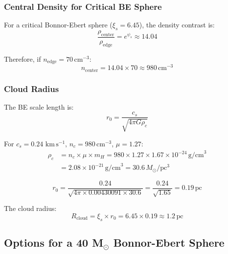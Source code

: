 \documentclass[11pt,a4paper]{article}
\newcommand{\Msun}{M_\odot}
\newcommand{\kms}{\,\mathrm{km\,s^{-1}}}
\begin{document}
\subsubsection{Central Density for Critical BE Sphere}

For a critical Bonnor-Ebert sphere ($\xi_s = 6.45$), the density contrast is:
\begin{equation}
    \frac{\rho_\mathrm{center}}{\rho_\mathrm{edge}} = e^{\psi_s} \approx 14.04
\end{equation}

Therefore, if $n_\mathrm{edge} = 70\,\mathrm{cm}^{-3}$:
\begin{equation}
    n_\mathrm{center} = 14.04 \times 70 \approx 980\,\mathrm{cm}^{-3}
\end{equation}

\subsubsection{Cloud Radius}

The BE scale length is:
\begin{equation}
    r_0 = \frac{c_s}{\sqrt{4\pi G \rho_c}}
\end{equation}

For $c_s = 0.24\,\kms$, $n_c = 980\,\mathrm{cm}^{-3}$, $\mu = 1.27$:
\begin{align}
    \rho_c &= n_c \times \mu \times m_H = 980 \times 1.27 \times 1.67 \times 10^{-24}\,\mathrm{g/cm}^3 \\
           &= 2.08 \times 10^{-21}\,\mathrm{g/cm}^3 = 30.6\,\Msun/\mathrm{pc}^3
\end{align}

\begin{equation}
    r_0 = \frac{0.24}{\sqrt{4\pi \times 0.00430091 \times 30.6}} = \frac{0.24}{\sqrt{1.65}} = 0.19\,\mathrm{pc}
\end{equation}

The cloud radius:
\begin{equation}
    R_\mathrm{cloud} = \xi_s \times r_0 = 6.45 \times 0.19 \approx 1.2\,\mathrm{pc}
\end{equation}

\subsection{Options for a 40 M$_\odot$ Bonnor-Ebert Sphere}
\end{document}
